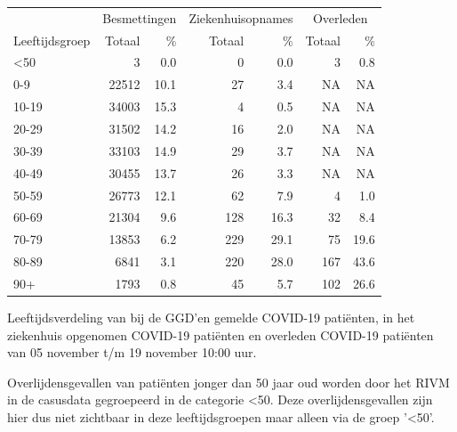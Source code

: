 \documentclass[
  english,
  man,floatsintext]{apa6}
\begin{document}
\begin{table}
\centering\begingroup\fontsize{11}{13}\selectfont

\begin{threeparttable}
\begin{tabular}{lrrrrrr}
\toprule
\multicolumn{1}{c}{ } & \multicolumn{2}{c}{Besmettingen} & \multicolumn{2}{c}{Ziekenhuisopnames} & \multicolumn{2}{c}{Overleden} \\
\cmidrule(l{3pt}r{3pt}){2-3} \cmidrule(l{3pt}r{3pt}){4-5} \cmidrule(l{3pt}r{3pt}){6-7}
Leeftijdsgroep & Totaal & \% & Totaal & \% & Totaal & \%\\
\midrule
<50 & 3 & 0.0 & 0 & 0.0 & 3 & 0.8\\
0-9 & 22512 & 10.1 & 27 & 3.4 & NA & NA\\
10-19 & 34003 & 15.3 & 4 & 0.5 & NA & NA\\
20-29 & 31502 & 14.2 & 16 & 2.0 & NA & NA\\
30-39 & 33103 & 14.9 & 29 & 3.7 & NA & NA\\
40-49 & 30455 & 13.7 & 26 & 3.3 & NA & NA\\
50-59 & 26773 & 12.1 & 62 & 7.9 & 4 & 1.0\\
60-69 & 21304 & 9.6 & 128 & 16.3 & 32 & 8.4\\
70-79 & 13853 & 6.2 & 229 & 29.1 & 75 & 19.6\\
80-89 & 6841 & 3.1 & 220 & 28.0 & 167 & 43.6\\
90+ & 1793 & 0.8 & 45 & 5.7 & 102 & 26.6\\
\bottomrule
\end{tabular}
\begin{tablenotes}
\item[1] Leeftijdsverdeling van bij de GGD’en gemelde COVID-19 patiënten, in het ziekenhuis opgenomen COVID-19 patiënten en overleden COVID-19 patiënten van 05 november t/m 19 november 10:00 uur.
\item[2] Overlijdensgevallen van patiënten jonger dan 50 jaar oud worden door het RIVM in de casusdata gegroepeerd in de categorie <50. Deze overlijdensgevallen zijn hier dus niet zichtbaar in deze leeftijdsgroepen maar alleen via de groep '<50'.
\end{tablenotes}
\end{threeparttable}
\endgroup{}
\end{table}

\newpage
\end{document}
